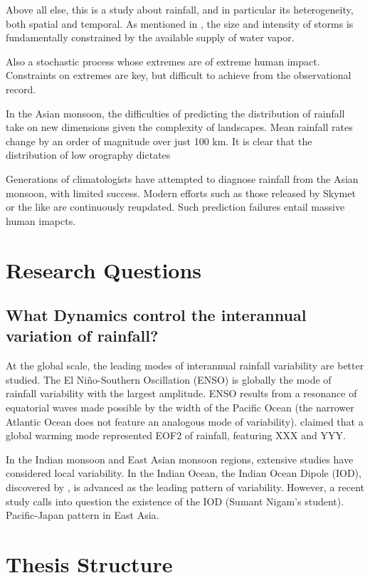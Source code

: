 Above all else, this is a study about rainfall, and in particular its heterogeneity, both spatial and temporal. As mentioned in \cite{Trenberth}, the size and intensity of storms is fundamentally constrained by the available supply of water vapor.

Also a stochastic process whose extremes are of extreme human impact. Constraints on extremes are key, but difficult to achieve from the observational record.

In the Asian monsoon, the difficulties of predicting the distribution of rainfall take on new dimensions given the complexity of landscapes. Mean rainfall rates change by an order of magnitude over just 100 km. It is clear that the distribution of low orography dictates 

Generations of climatologists have attempted to diagnose rainfall from the Asian monsoon, with limited success. Modern efforts such as those released by Skymet or the like are continuously reupdated. Such prediction failures entail massive human imapcts.




\section{Research Questions}

\subsection{What Dynamics control the interannual variation of rainfall?}
	
	At the global scale, the leading modes of interannual rainfall variability are better studied. The El Ni\~no-Southern Oscillation (ENSO) is globally the mode of rainfall variability with the largest amplitude. ENSO results from a resonance of equatorial waves made possible by the width of the Pacific Ocean (the narrower Atlantic Ocean does not feature an analogous mode of variability). \cite{Dai} claimed that a global warming mode represented EOF2 of rainfall, featuring XXX and YYY. 	
	
	In the Indian monsoon and East Asian monsoon regions, extensive studies have considered local variability. In the Indian Ocean, the Indian Ocean Dipole (IOD), discovered by \cite{Goswami}, is advanced as the leading pattern of variability. However, a recent study calls into question the existence of the IOD (Sumant Nigam's student).
 Pacific-Japan pattern in East Asia.

\section{Thesis Structure}


